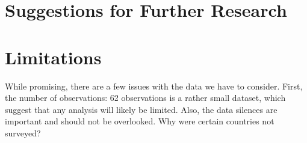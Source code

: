 \documentclass[
]{article}
\begin{document}
\hypertarget{suggestions-for-further-research}{%
\section{Suggestions for Further
Research}\label{suggestions-for-further-research}}

\hypertarget{limitations}{%
\section{Limitations}\label{limitations}}

While promising, there are a few issues with the data we have to
consider. First, the number of observations: 62 observations is a rather
small dataset, which suggest that any analysis will likely be limited.
Also, the data silences are important and should not be overlooked. Why
were certain countries not surveyed?
\end{document}

